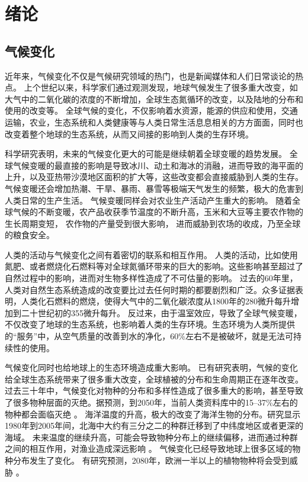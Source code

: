 \chapter{绪论}
\label{cha:intro}

\section{气候变化}

近年来，气候变化不仅是气候研究领域的热门，也是新闻媒体和人们日常谈论的热点。
上个世纪以来，科学家们通过观测发现，地球气候发生了很多重大改变，如大气中的二氧化碳的浓度的不断增加，全球生态氮循环的改变，以及陆地的分布和使用的改变等\cite{vitousek1994beyond}。
全球气候的变化，不仅影响着水资源，能源的供应和使用，交通运输，农业，生态系统和人类健康等与人类日常生活息息相关的方方面面\cite{karl2009global}，同时也改变着整个地球的生态系统，从而又间接的影响到人类的生存环境。



科学研究表明，未来的气候变化更大的可能是继续朝着全球变暖的趋势发展\cite{solomon2007climate,stocker2013ipcc}。
全球气候变暖的最直接的影响是导致冰川、动土和海冰的消融，进而导致的海平面的上升，以及亚热带沙漠地区面积的扩大等，这些改变都会直接威胁到人类的生存。
气候变暖还会增加热潮、干旱、暴雨、暴雪等极端天气发生的频繁，极大的危害到人类日常的生产生活\cite{solomon2007climate}。
气候变暖同样会对农业生产活动产生重大的影响。 随着全球气候的不断变暖，农产品收获季节温度的不断升高，玉米和大豆等主要农作物的生长周期变短， 农作物的产量受到很大影响， 进而威胁到农场的收成，乃至全球的粮食安全\cite{battisti2009historical,adams1990global,smith1989potential}。 

人类的活动与气候变化之间有着密切的联系和相互作用。
人类的活动，比如使用氮肥、或者燃烧化石燃料等对全球氮循环带来的巨大的影响。这些影响甚至超过了自然过程中的影响，进而对生物多样性造成了不可估量的影响。
过去的60年里，人类对自然生态系统造成的改变要比过去任何时期的都要剧烈和广泛。众多证据表明，人类化石燃料的燃烧，使得大气中的二氧化碳浓度从1800年的280微升每升增加到二十世纪初的355微升每升\cite{vitousek1994beyond}。
反过来，由于温室效应，导致了全球气候变暖，不仅改变了地球的生态系统，也影响着人类的生存环境。生态环境为人类所提供的“服务”中，从空气质量的改善到水的净化，60\%左右不是被破坏，就是无法可持续性的使用\cite{assessment2005ecosystems}。



气候变化同时也给地球上的生态环境造成重大影响。
已有研究表明，气候的变化给全球生态系统带来了很多重大改变，全球植被的分布和生命周期正在逐年改变\cite{parmesan2003globally}。
过去三十年中，气候变化对物种的分布和多样性造成了很多重大的影响，甚至导致了很多物种层面的灭绝。据预测，到2050年，当前人类资料库中的15–37\%左右的物种都会面临灭绝 \cite{thomas2004extinction} 。
海洋温度的升高，极大的改变了海洋生物的分布。研究显示1980年到2005年间，北海中大约有三分之二的种群迁移到了中纬度地区或者更深的海域。
未来温度的继续升高，可能会导致物种分布上的继续偏移，进而通过种群之间的相互作用，对渔业造成深远影响\cite{perry2005climate} 。
气候变化已经导致地球上很多区域的物种分布发生了变化。 
有研究预测，2080年，欧洲一半以上的植物物种将会受到威胁\cite{thuiller2005climate} 。

